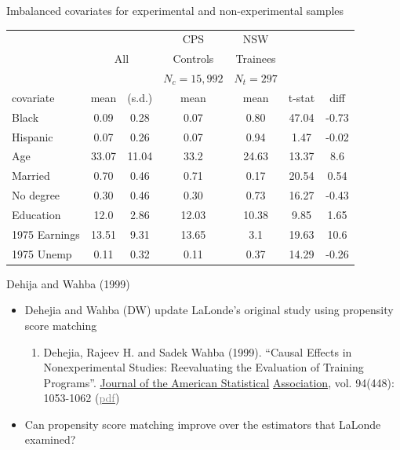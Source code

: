 \documentclass{beamer}
\newcommand{\myurlshort}[2]{\href{#1}{\textcolor{gray}{\textsf{#2}}}}
\begin{document}
\begin{frame}[plain,shrink=10]{Imbalanced covariates for experimental and non-experimental samples}

    \begin{center}
		\begin{table}
		\begin{tabular}{lcccccc}
		\hline \hline
		\multicolumn{3}{c}{}&
		\multicolumn{1}{c}{CPS}&
		\multicolumn{1}{c}{NSW}\\
		
		\multicolumn{1}{c}{}&
		\multicolumn{2}{c}{All} &
		\multicolumn{1}{c}{Controls} &
		\multicolumn{1}{c}{Trainees} \\

		\multicolumn{3}{c}{}&
		\multicolumn{1}{c}{$N_c=15,992$}&
		\multicolumn{1}{c}{$N_t=297$}&
		\multicolumn{1}{c}{}&
		\multicolumn{1}{c}{}\\

		\multicolumn{1}{l}{covariate}&
		\multicolumn{1}{c}{mean}&
		\multicolumn{1}{c}{(s.d.)}&
		\multicolumn{1}{c}{mean}&
		\multicolumn{1}{c}{mean}&
		\multicolumn{1}{c}{t-stat}&
		\multicolumn{1}{c}{diff}\\
		\hline
Black    & 0.09 & 0.28 & 0.07 & 0.80 & 47.04 & -0.73\\
Hispanic & 0.07 & 0.26 & 0.07 & 0.94 & 1.47 & -0.02\\
Age & 33.07 & 11.04 & 33.2 & 24.63 & 13.37  & 8.6\\
Married & 0.70 & 0.46 & 0.71 & 0.17 & 20.54 & 0.54\\
No degree & 0.30 & 0.46 & 0.30 & 0.73 & 16.27 & -0.43\\
Education & 12.0 & 2.86 & 12.03 & 10.38 & 9.85 & 1.65 \\
1975 Earnings   & 13.51 & 9.31 & 13.65 & 3.1 & 19.63 & 10.6\\
1975 Unemp  & 0.11 & 0.32 & 0.11 & 0.37 & 14.29 & -0.26\\
		\hline 
		\end{tabular}
		\end{table}
    \end{center}

\end{frame}


\begin{frame}{Dehija and Wahba (1999)}
	
	\begin{itemize}
	\item Dehejia and Wahba (DW) update LaLonde's original study using propensity score matching
		\begin{enumerate}
		\item Dehejia, Rajeev H. and Sadek Wahba (1999). 	``Causal Effects in Nonexperimental Studies: Reevaluating the Evaluation of Training Programs''. \underline{Journal of the American Statistical} \underline{Association}, vol. 94(448): 1053-1062 (\myurlshort{http://business.baylor.edu/scott_cunningham/teaching/dehejia-and-wahba-1999.pdf}{pdf})
		\end{enumerate}
	\item Can propensity score matching improve over the estimators that LaLonde examined?
	\end{itemize}
\end{frame}
\end{document}
